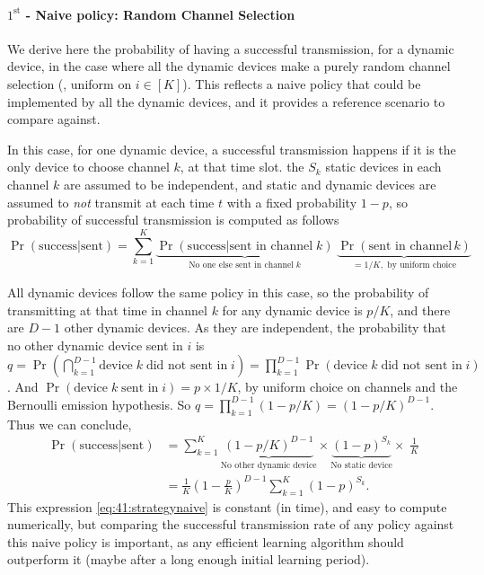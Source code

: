 \paragraph{$1^{\text{st}}$ - Naive policy: Random Channel Selection}

We derive here the probability of having a successful transmission, for a dynamic device, in the case where all the dynamic devices make a purely random channel selection (\ie, uniform on $i \in [K]$).
This reflects a naive policy that could be implemented by all the dynamic devices, and it provides a reference scenario to compare against.

In this case, for one dynamic device, a successful transmission happens if it is the only device to choose channel $k$, at that time slot.
the $S_k$ static devices in each channel $k$ are assumed to be independent, and static and dynamic devices are assumed to \emph{not} transmit at each time $t$ with a fixed probability $1-p$,
so probability of successful transmission is computed as follows
\begin{equation}
    \Pr(\text{success}|\text{sent}) = \sum_{k=1}^{K} \underbrace{\Pr(\text{success}|\text{sent in channel}\;k)}_{\text{No one else sent in channel}\; k} \; \underbrace{\Pr(\text{sent in channel}\,k)}_{= 1/K, \text{ by uniform choice}}
\end{equation}

All dynamic devices follow the same policy in this case, so the probability of transmitting at that time in channel $k$ for any dynamic device is $p / K$, and there are $D-1$ other dynamic devices.
As they are independent, the probability that no other dynamic device sent in $i$
is $q = \Pr(\bigcap_{k=1}^{D-1} \text{device}\;k\;\text{did not sent in}\;i) = \prod_{k=1}^{D-1} \Pr(\text{device}\;k\;\text{did not sent in}\;i)$. And $\Pr(\text{device}\;k\;\text{sent in}\;i) = p \times 1 / K$, by uniform choice on channels and the Bernoulli emission hypothesis. So $q = \prod_{k=1}^{D-1} (1 - p/K) = (1-p/K)^{D-1}$. Thus we can conclude,
%
\begin{align}\label{eq:41:strategynaive}
    \Pr(\text{success}|\text{sent})
    & = \sum_{k=1}^{K} \underbrace{(1 - p / K)^{D-1}}_{\text{No other dynamic device}} \times \underbrace{(1-p)^{S_k}}_{\text{No static device}} \times\; \frac{1}{K} \nonumber \\
    & = \frac{1}{K} \left(1-\frac{p}{K}\right)^{D-1} \sum_{k=1}^{K} (1-p)^{S_k} .
\end{align}
This expression \eqref{eq:41:strategynaive} is constant (in time), and easy to compute numerically, but comparing the successful transmission rate of any policy against this naive policy is important, as any efficient learning algorithm should outperform it
(maybe after a long enough initial learning period).


